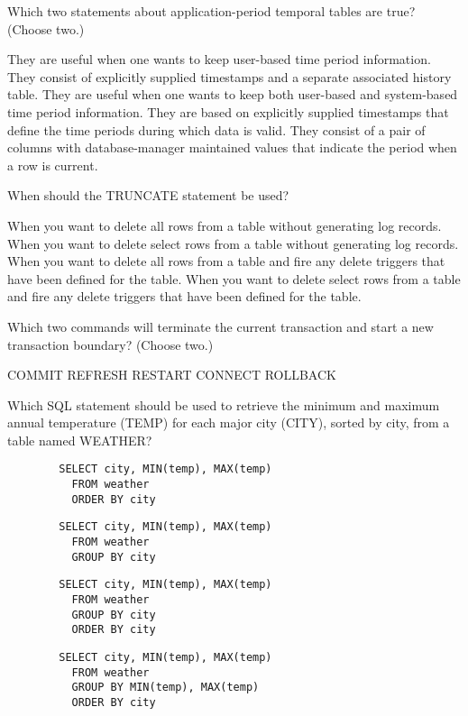 \documentclass[11pt]{exam}
\begin{document}
\begin{questions}
\question[1]
Which two statements about application-period temporal tables are true? (Choose two.)
\begin{choices}
\choice They are useful when one wants to keep user-based time period information.
\choice They consist of explicitly supplied timestamps and a separate associated history table.
\choice They are useful when one wants to keep both user-based and system-based time period information.
\choice They are based on explicitly supplied timestamps that define the time periods during which
data is valid.
\choice They consist of a pair of columns with database-manager maintained values that indicate the 
period when a row is current.
\end{choices}

\newpage
\question[1]
When should the TRUNCATE statement be used?
\begin{choices}
\choice When you want to delete all rows from a table without generating log records.
\choice When you want to delete select rows from a table without generating log records.
\choice When you want to delete all rows from a table and fire any delete triggers that have been 
defined for the table.
\choice When you want to delete select rows from a table and fire any delete triggers that have been
defined for the table.
\end{choices}

\question[1]
Which two commands will terminate the current transaction and start a new transaction boundary?
(Choose two.)
\begin{choices}
\choice COMMIT
\choice REFRESH
\choice RESTART
\choice CONNECT
\choice ROLLBACK
\end{choices}

\question[1]
Which SQL statement should be used to retrieve the minimum and maximum annual temperature (TEMP) for
each major city (CITY), sorted by city, from a table named WEATHER?
\begin{choices}
\choice \begin{verbatim}
		SELECT city, MIN(temp), MAX(temp)
		  FROM weather
		  ORDER BY city
		\end{verbatim}
\choice \begin{verbatim}
		SELECT city, MIN(temp), MAX(temp)
		  FROM weather
		  GROUP BY city
		\end{verbatim}
\choice \begin{verbatim}
		SELECT city, MIN(temp), MAX(temp)
		  FROM weather
		  GROUP BY city
		  ORDER BY city
		\end{verbatim}
\choice \begin{verbatim}
		SELECT city, MIN(temp), MAX(temp)
		  FROM weather
		  GROUP BY MIN(temp), MAX(temp)
		  ORDER BY city
		\end{verbatim}
\end{choices}


\end{questions}
\end{document}

